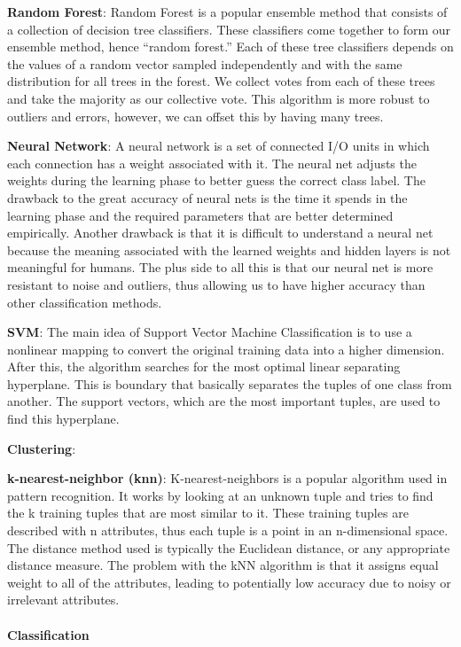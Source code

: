 \documentclass[11pt]{article}
\begin{document}
\textbf{Random Forest}: Random Forest is a popular ensemble method that
consists of a collection of decision tree classifiers. These classifiers
come together to form our ensemble method, hence ``random forest.'' Each
of these tree classifiers depends on the values of a random vector
sampled independently and with the same distribution for all trees in
the forest. We collect votes from each of these trees and take the
majority as our collective vote. This algorithm is more robust to
outliers and errors, however, we can offset this by having many trees.

\textbf{Neural Network}: A neural network is a set of connected I/O
units in which each connection has a weight associated with it. The
neural net adjusts the weights during the learning phase to better guess
the correct class label. The drawback to the great accuracy of neural
nets is the time it spends in the learning phase and the required
parameters that are better determined empirically. Another drawback is
that it is difficult to understand a neural net because the meaning
associated with the learned weights and hidden layers is not meaningful
for humans. The plus side to all this is that our neural net is more
resistant to noise and outliers, thus allowing us to have higher
accuracy than other classification methods.

\textbf{SVM}: The main idea of Support Vector Machine Classification is
to use a nonlinear mapping to convert the original training data into a
higher dimension. After this, the algorithm searches for the most
optimal linear separating hyperplane. This is boundary that basically
separates the tuples of one class from another. The support vectors,
which are the most important tuples, are used to find this hyperplane.

\textbf{Clustering}:

\textbf{k-nearest-neighbor (knn)}: K-nearest-neighbors is a popular
algorithm used in pattern recognition. It works by looking at an unknown
tuple and tries to find the k training tuples that are most similar to
it. These training tuples are described with n attributes, thus each
tuple is a point in an n-dimensional space. The distance method used is
typically the Euclidean distance, or any appropriate distance measure.
The problem with the kNN algorithm is that it assigns equal weight to
all of the attributes, leading to potentially low accuracy due to noisy
or irrelevant attributes.

    \hypertarget{classification}{%
\paragraph{Classification}\label{classification}}
\end{document}
